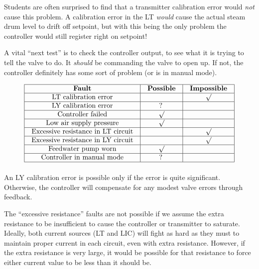 





Students are often surprised to find that a transmitter calibration error would {\it not} cause this problem.  A calibration error in the LT {\it would} cause the actual steam drum level to drift off setpoint, but with this being the only problem the controller would still register right on setpoint!

\vskip 10pt

A vital ``next test'' is to check the controller output, to see what it is trying to tell the valve to do.  It {\it should} be commanding the valve to open up.  If not, the controller definitely has some sort of problem (or is in manual mode).








$$\vbox{\offinterlineskip
\halign{\strut
\vrule \quad\hfil # \ \hfil & 
\vrule \quad\hfil # \ \hfil & 
\vrule \quad\hfil # \ \hfil \vrule \cr
\noalign{\hrule}
%
{\bf Fault} & {\bf Possible} & {\bf Impossible} \cr
%
\noalign{\hrule}
%
LT calibration error &  & $\surd$ \cr
%
\noalign{\hrule}
%
LY calibration error & ? &  \cr
%
\noalign{\hrule}
%
Controller failed & $\surd$ &  \cr
%
\noalign{\hrule}
%
Low air supply pressure & $\surd$ &  \cr
%
\noalign{\hrule}
%
Excessive resistance in LT circuit &  & $\surd$ \cr
%
\noalign{\hrule}
%
Excessive resistance in LY circuit &  & $\surd$ \cr
%
\noalign{\hrule}
%
Feedwater pump worn & $\surd$ &  \cr
%
\noalign{\hrule}
%
Controller in manual mode & ? &  \cr
%
\noalign{\hrule}
} %
}$$ %

An LY calibration error is possible only if the error is quite significant.  Otherwise, the controller will compensate for any modest valve errors through feedback.

The ``excessive resistance'' faults are not possible if we assume the extra resistance to be insufficient to cause the controller or transmitter to saturate.  Ideally, both current sources (LT and LIC) will fight as hard as they must to maintain proper current in each circuit, even with extra resistance.  However, if the extra resistance is very large, it would be possible for that resistance to force either current value to be less than it should be.

